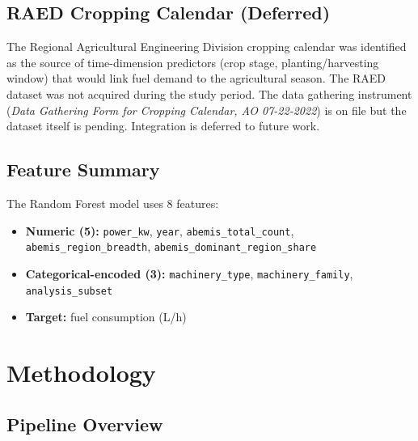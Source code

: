 \documentclass[conference]{IEEEtran}
\begin{document}
\subsection{RAED Cropping Calendar (Deferred)}

The Regional Agricultural Engineering Division cropping calendar was identified as the source of time-dimension predictors (crop stage, planting/harvesting window) that would link fuel demand to the agricultural season. The RAED dataset was not acquired during the study period. The data gathering instrument (\emph{Data Gathering Form for Cropping Calendar, AO 07-22-2022}) is on file but the dataset itself is pending. Integration is deferred to future work.

\subsection{Feature Summary}

The Random Forest model uses 8 features:
\begin{itemize}
  \item \textbf{Numeric (5):} \texttt{power\_kw}, \texttt{year}, \texttt{abemis\_total\_count}, \texttt{abemis\_region\_breadth}, \texttt{abemis\_dominant\_region\_share}
  \item \textbf{Categorical-encoded (3):} \texttt{machinery\_type}, \texttt{machinery\_family}, \texttt{analysis\_subset}
  \item \textbf{Target:} fuel consumption (L/h)
\end{itemize}

\section{Methodology}

\subsection{Pipeline Overview}
\end{document}

